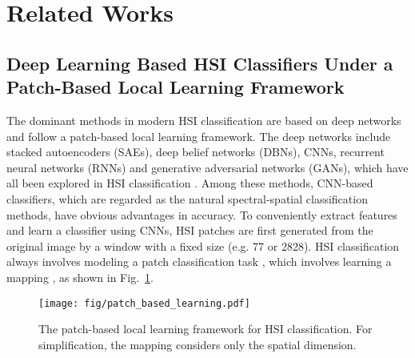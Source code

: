 \documentclass[journal]{IEEEtran}
\begin{document}
\section{Related Works}
\label{sec:relate}




\subsection{Deep Learning Based HSI Classifiers Under a Patch-Based Local Learning Framework}
The dominant methods in modern HSI classification are based on deep networks and follow a patch-based local learning framework.
The deep networks include stacked autoencoders (SAEs), deep belief networks (DBNs), CNNs, recurrent neural networks (RNNs) and generative adversarial networks (GANs), which have all been explored in HSI classification \cite{chen2014deep, chen2015spectral,hu2015deep,chen2016deep, zhao2016spectral,xu2018spectral, gong2019cnn,hang2019cascaded, zhou2019learning}.
Among these methods, CNN-based classifiers, which are regarded as the natural spectral-spatial classification methods, have obvious advantages in accuracy.
To conveniently extract features and learn a classifier using CNNs, HSI patches are first generated from the original image by a window with a fixed size  (e.g. 77 or 2828).
HSI classification always involves modeling a patch classification task \cite{ghamisi2018new, li2019deep}, which involves learning a mapping , as shown in Fig.~\ref{fig:pbl}.

\begin{figure}[h]
  \centering
  \texttt{[image: fig/patch\_based\_learning.pdf]}
  \caption{The patch-based local learning framework for HSI classification. For simplification, the mapping considers only the spatial dimension.}
  \label{fig:pbl}
\end{figure}
\end{document}
